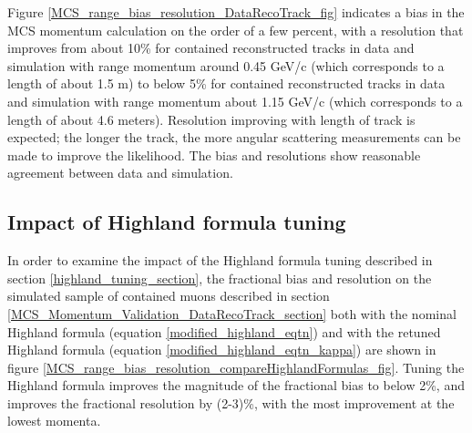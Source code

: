 \documentclass[a4paper,11pt]{article}
\begin{document}
Figure \ref{MCS_range_bias_resolution_DataRecoTrack_fig} indicates a bias in the MCS momentum calculation on the order of a few percent, with a resolution that improves from about 10\% for contained reconstructed tracks in data and simulation with range momentum around 0.45 GeV/c (which corresponds to a length of about 1.5 m) to below 5\% for contained reconstructed tracks in data and simulation with range momentum about 1.15 GeV/c (which corresponds to a length of about 4.6 meters). Resolution improving with length of track is expected; the longer the track, the more angular scattering measurements can be made to improve the likelihood. The bias and resolutions show reasonable agreement between data and simulation.\\

\subsection{Impact of Highland formula tuning}\label{highland_formula_tuning_impact_section}

In order to examine the impact of the Highland formula tuning described in section \ref{highland_tuning_section}, the fractional bias and resolution on the simulated sample of contained muons described in section \ref{MCS_Momentum_Validation_DataRecoTrack_section} both with the nominal Highland formula (equation \ref{modified_highland_eqtn}) and with the retuned Highland formula (equation \ref{modified_highland_eqtn_kappa}) are shown in figure \ref{MCS_range_bias_resolution_compareHighlandFormulas_fig}. Tuning the Highland formula improves the magnitude of the fractional bias to below 2\%, and improves the fractional resolution by (2-3)\%, with the most improvement at the lowest momenta.
\end{document}
